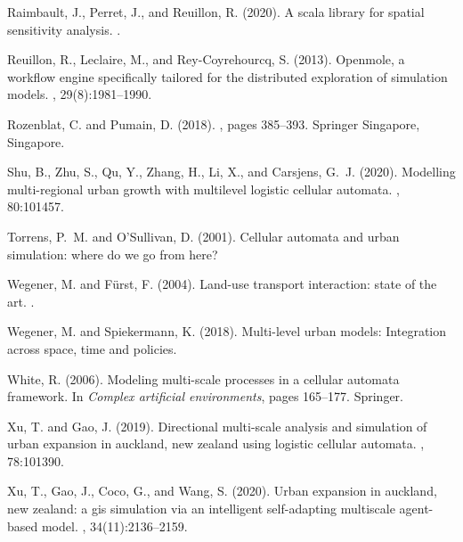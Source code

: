 \documentclass[11pt]{article}
\begin{document}
\begin{thebibliography}{}
Raimbault, J., Perret, J., and Reuillon, R. (2020).
\newblock A scala library for spatial sensitivity analysis.
.

Reuillon, R., Leclaire, M., and Rey-Coyrehourcq, S. (2013).
\newblock Openmole, a workflow engine specifically tailored for the distributed
  exploration of simulation models.
, 29(8):1981--1990.

Rozenblat, C. and Pumain, D. (2018).
,
  pages 385--393.
\newblock Springer Singapore, Singapore.

Shu, B., Zhu, S., Qu, Y., Zhang, H., Li, X., and Carsjens, G.~J. (2020).
\newblock Modelling multi-regional urban growth with multilevel logistic
  cellular automata.
, 80:101457.

Torrens, P.~M. and O'Sullivan, D. (2001).
\newblock Cellular automata and urban simulation: where do we go from here?

Wegener, M. and F{\"u}rst, F. (2004).
\newblock Land-use transport interaction: state of the art.
.

Wegener, M. and Spiekermann, K. (2018).
\newblock Multi-level urban models: Integration across space, time and
  policies.

White, R. (2006).
\newblock Modeling multi-scale processes in a cellular automata framework.
\newblock In {\em Complex artificial environments}, pages 165--177. Springer.

Xu, T. and Gao, J. (2019).
\newblock Directional multi-scale analysis and simulation of urban expansion in
  auckland, new zealand using logistic cellular automata.
, 78:101390.

Xu, T., Gao, J., Coco, G., and Wang, S. (2020).
\newblock Urban expansion in auckland, new zealand: a gis simulation via an
  intelligent self-adapting multiscale agent-based model.
,
  34(11):2136--2159.


\end{thebibliography}
\end{document}
